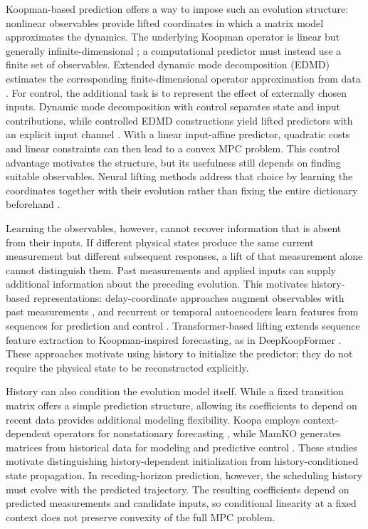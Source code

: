 \documentclass[journal]{IEEEtran}
\theoremstyle{plain}
\theoremstyle{definition}
\begin{document}
Koopman-based prediction offers a way to impose such an evolution structure: nonlinear observables provide lifted coordinates in which a matrix model approximates the dynamics. The underlying Koopman operator is linear but generally infinite-dimensional \cite{koopman1931hamiltonian,mezic2005spectral,brunton2022modern}; a computational predictor must instead use a finite set of observables. Extended dynamic mode decomposition (EDMD) estimates the corresponding finite-dimensional operator approximation from data \cite{williams2015data}. For control, the additional task is to represent the effect of externally chosen inputs. Dynamic mode decomposition with control separates state and input contributions, while controlled EDMD constructions yield lifted predictors with an explicit input channel \cite{proctor2016dmdc,korda2018linear}. With a linear input-affine predictor, quadratic costs and linear constraints can then lead to a convex MPC problem. This control advantage motivates the structure, but its usefulness still depends on finding suitable observables. Neural lifting methods address that choice by learning the coordinates together with their evolution rather than fixing the entire dictionary beforehand \cite{takeishi2017koopman,lusch2018deep,otto2019linearly,han2020deep}.

Learning the observables, however, cannot recover information that is absent from their inputs. If different physical states produce the same current measurement but different subsequent responses, a lift of that measurement alone cannot distinguish them. Past measurements and applied inputs can supply additional information about the preceding evolution. This motivates history-based representations: delay-coordinate approaches augment observables with past measurements \cite{kamb2020timedelay,das2019delay}, and recurrent or temporal autoencoders learn features from sequences for prediction and control \cite{han2024robust,shenoy2025temporal}. Transformer-based lifting extends sequence feature extraction to Koopman-inspired forecasting, as in DeepKoopFormer \cite{forootani2026deepkoopformer}. These approaches motivate using history to initialize the predictor; they do not require the physical state to be reconstructed explicitly.

History can also condition the evolution model itself. While a fixed transition matrix offers a simple prediction structure, allowing its coefficients to depend on recent data provides additional modeling flexibility. Koopa employs context-dependent operators for nonstationary forecasting \cite{liu2023koopa}, while MamKO generates matrices from historical data for modeling and predictive control \cite{li2025mamko}. These studies motivate distinguishing history-dependent initialization from history-conditioned state propagation. In receding-horizon prediction, however, the scheduling history must evolve with the predicted trajectory. The resulting coefficients depend on predicted measurements and candidate inputs, so conditional linearity at a fixed context does not preserve convexity of the full MPC problem.
\end{document}

